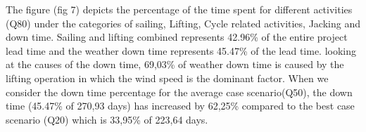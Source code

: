 The figure (fig 7) depicts the percentage of the time spent for different activities (Q80) under the categories of sailing, Lifting, Cycle related activities, Jacking and down time. Sailing and lifting combined represents 42.96\% of the entire project lead time and the weather down time represents 45.47\% of the lead time. looking at the causes of the down time, 69,03\% of weather down time is caused by the lifting operation in which the wind speed is the dominant factor. When we consider the down time percentage for the average case scenario(Q50), the down time (45.47\% of 270,93 days) has increased by 62,25\% compared to the best case scenario (Q20) which is 33,95\% of 223,64 days.